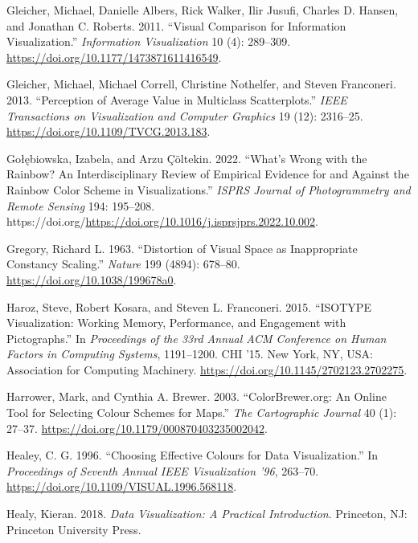 \documentclass[
  letterpaper,
  DIV=11,
  numbers=noendperiod]{scrreprt}
\newlength{\cslhangindent}
\newenvironment{CSLReferences}[2] %
 {\begin{list}{}{%
  \setlength{\itemindent}{0pt}
  \setlength{\leftmargin}{0pt}
  \setlength{\parsep}{0pt}
  \ifodd #1
   \setlength{\leftmargin}{\cslhangindent}
   \setlength{\itemindent}{-1\cslhangindent}
  \fi
  \setlength{\itemsep}{#2\baselineskip}}}
 {\end{list}}
\begin{document}
\begin{CSLReferences}{1}{0}
Gleicher, Michael, Danielle Albers, Rick Walker, Ilir Jusufi, Charles D.
Hansen, and Jonathan C. Roberts. 2011. {``Visual Comparison for
Information Visualization.''} \emph{Information Visualization} 10 (4):
289--309. \url{https://doi.org/10.1177/1473871611416549}.

Gleicher, Michael, Michael Correll, Christine Nothelfer, and Steven
Franconeri. 2013. {``Perception of Average Value in Multiclass
Scatterplots.''} \emph{IEEE Transactions on Visualization and Computer
Graphics} 19 (12): 2316--25.
\url{https://doi.org/10.1109/TVCG.2013.183}.

Gołębiowska, Izabela, and Arzu Çöltekin. 2022. {``What's Wrong with the
Rainbow? An Interdisciplinary Review of Empirical Evidence for and
Against the Rainbow Color Scheme in Visualizations.''} \emph{ISPRS
Journal of Photogrammetry and Remote Sensing} 194: 195--208.
https://doi.org/\url{https://doi.org/10.1016/j.isprsjprs.2022.10.002}.

Gregory, Richard L. 1963. {``Distortion of Visual Space as Inappropriate
Constancy Scaling.''} \emph{Nature} 199 (4894): 678--80.
\url{https://doi.org/10.1038/199678a0}.

Haroz, Steve, Robert Kosara, and Steven L. Franconeri. 2015. {``ISOTYPE
Visualization: Working Memory, Performance, and Engagement with
Pictographs.''} In \emph{Proceedings of the 33rd Annual ACM Conference
on Human Factors in Computing Systems}, 1191--1200. CHI '15. New York,
NY, USA: Association for Computing Machinery.
\url{https://doi.org/10.1145/2702123.2702275}.

Harrower, Mark, and Cynthia A. Brewer. 2003. {``ColorBrewer.org: An
Online Tool for Selecting Colour Schemes for Maps.''} \emph{The
Cartographic Journal} 40 (1): 27--37.
\url{https://doi.org/10.1179/000870403235002042}.

Healey, C. G. 1996. {``Choosing Effective Colours for Data
Visualization.''} In \emph{Proceedings of Seventh Annual IEEE
Visualization '96}, 263--70.
\url{https://doi.org/10.1109/VISUAL.1996.568118}.

Healy, Kieran. 2018. \emph{Data Visualization: A Practical
Introduction}. Princeton, NJ: Princeton University Press.


\end{CSLReferences}
\end{document}
